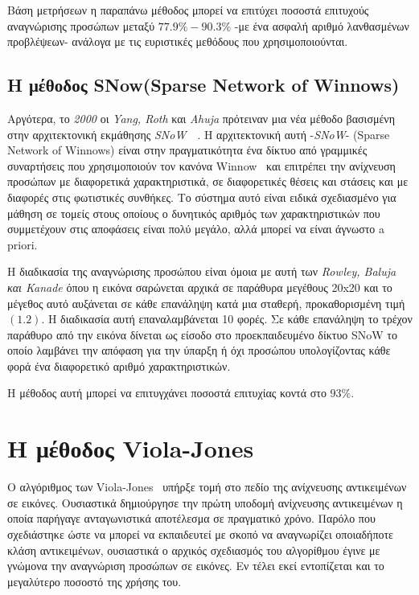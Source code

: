 Βάση μετρήσεων η παραπάνω μέθοδος μπορεί να επιτύχει ποσοστά επιτυχούς αναγνώρισης
προσώπων μεταξύ $77.9\% - 90.3\%$ -με ένα ασφαλή αριθμό λανθασμένων προβλέψεων-
ανάλογα με τις ευριστικές μεθόδους που χρησιμοποιούνται.

\subsection{H μέθοδος SNow(Sparse Network of Winnows)~\cite{Yang00asnow-based}}

Αργότερα, το \emph{2000} οι \emph{Yang, Roth} και \emph{Ahuja} πρότειναν μια νέα
μέθοδο βασισμένη στην αρχιτεκτονική εκμάθησης \emph{SNoW}~\cite{Roth98learningto}~\cite{CCRR99}.
Η αρχιτεκτονική αυτή -\emph{SNoW}- (Sparse Network of Winnows)
είναι στην πραγματικότητα ένα δίκτυο από γραμμικές συναρτήσεις που χρησιμοποιούν
τον κανόνα Winnow~\cite{Littlestone:1988:LQI:639961.639994} και επιτρέπει την
ανίχνευση προσώπων με διαφορετικά χαρακτηριστικά, σε διαφορετικές θέσεις και
στάσεις και με διαφορές στις φωτιστικές συνθήκες. Το σύστημα αυτό είναι ειδικά
σχεδιασμένο για μάθηση σε τομείς στους οποίους ο δυνητικός αριθμός των
χαρακτηριστικών που συμμετέχουν στις αποφάσεις είναι πολύ μεγάλο, αλλά μπορεί να
είναι άγνωστο a priori.

Η διαδικασία της αναγνώρισης προσώπου είναι όμοια με αυτή των \emph{Rowley, Baluja και Kanade}
όπου η εικόνα σαρώνεται αρχικά σε παράθυρα μεγέθους 20x20 και το μέγεθος αυτό
αυξάνεται σε κάθε επανάληψη κατά μια σταθερή, προκαθορισμένη τιμή $(1.2)$. Η
διαδικασία αυτή επαναλαμβάνεται 10 φορές. Σε κάθε επανάληψη το τρέχον παράθυρο
από την εικόνα δίνεται ως είσοδο στο προεκπαιδευμένο δίκτυο SNoW το οποίο λαμβάνει
την απόφαση για την ύπαρξη ή όχι προσώπου υπολογίζοντας κάθε φορά ένα διαφορετικό
αριθμό χαρακτηριστικών.

Η μέθοδος αυτή μπορεί να επιτυγχάνει ποσοστά επιτυχίας κοντά στο $93\%$.

\section{H μέθοδος Viola-Jones}\label{sec:violjon}

O αλγόριθμος των Viola-Jones~\cite{Viola01rapidobject} υπήρξε τομή στο πεδίο
της ανίχνευσης αντικειμένων σε εικόνες. Ουσιαστικά δημιούργησε την πρώτη
υποδομή ανίχνευσης αντικειμένων η οποία παρήγαγε ανταγωνιστικά αποτέλεσμα σε
πραγματικό χρόνο. Παρόλο που σχεδιάστηκε ώστε να μπορεί να εκπαιδευτεί με σκοπό
να αναγνωρίζει οποιαδήποτε κλάση αντικειμένων, ουσιαστικά ο αρχικός σχεδιασμός
του αλγορίθμου έγινε με γνώμονα την αναγνώριση προσώπων σε εικόνες. Εν τέλει
εκεί εντοπίζεται και το μεγαλύτερο ποσοστό της χρήσης του.

